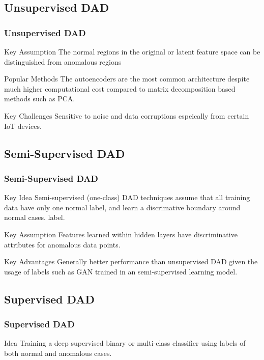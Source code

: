 \documentclass{beamer}
\begin{document}
\subsection{Unsupervised DAD}
\begin{frame}
\frametitle{Unsupervised DAD}
\begin{block}{Key Assumption}
The normal regions in the original or latent feature space can be distinguished from anomalous regions
\end{block}

\begin{block}{Popular Methods}
The autoencoders are the most common architecture despite much higher computational cost compared to matrix decomposition based methods such as PCA.
\end{block}

\begin{block}{Key Challenges}
Sensitive to noise and data corruptions espeically from certain IoT devices.
\end{block}

\subsection{Semi-Supervised DAD}
\begin{frame}
\frametitle{Semi-Supervised DAD}
\begin{block}{Key Idea}
Semi-supervised (one-class) DAD techniques assume that all training data have only one normal label, and learn a discrimative boundary around normal cases.
label.
\end{block}

\begin{block}{Key Assumption}
Features learned within hidden layers have discriminative attributes for anomalous data points.
\end{block}

\begin{block}{Key Advantages}
Generally better performance than unsupervised DAD given the usage of labels such as GAN trained in an semi-supervised learning model.
\end{block}


\subsection{Supervised DAD}
\begin{frame}
\frametitle{Supervised DAD}
\begin{block}{Idea}
Training a deep supervised binary or multi-class classifier using labels of both normal and anomalous cases.
\end{block}


\end{frame}
\end{frame}
\end{frame}
\end{document}
